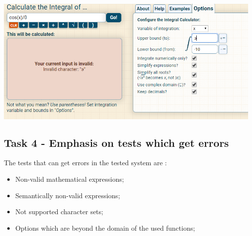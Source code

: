 \begin{center}
	\includegraphics[scale=0.7]{images/Case4}
	\vspace{1cm}
\end{center}

\subsection{Task 4 - Emphasis on tests which get errors}

The tests that can get errors in the tested system are :

\begin{itemize}
	\item Non-valid mathematical expressions;
	\item Semantically non-valid expressions;
	\item Not supported character sets;
	\item Options which are beyond the domain of the used functions;
\end{itemize}

\clearpage
